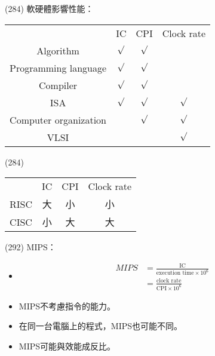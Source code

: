 \item \begin{theorem}{(284)} 軟硬體影響性能：
    \begin{table}[H]
        \centering
        \begin{tabular}{|c|c|c|c|}
            \hline
             & IC & CPI & Clock rate \\
            \Xhline{2\arrayrulewidth}
            Algorithm & $\surd$ & $\surd$ & \\
            \hline
            Programming language & $\surd$ & $\surd$ & \\
            \hline
            Compiler & $\surd$ & $\surd$ & \\
            \hline
            ISA & $\surd$ & $\surd$ & $\surd$ \\
            \hline
            Computer organization & & $\surd$ & $\surd$ \\
            \hline
            VLSI & & & $\surd$ \\
            \hline
        \end{tabular}
    \end{table}
\end{theorem}

\item \begin{theorem}{(284)} \quad\quad
    \begin{table}[H]
        \centering
        \begin{tabular}{|c|c|c|c|}
            \hline
             & IC & CPI & Clock rate \\
            \Xhline{2\arrayrulewidth}
            RISC & 大 & 小 & 小 \\
            \hline
            CISC & 小 & 大 & 大 \\
            \hline
        \end{tabular}
    \end{table}
\end{theorem}

\item \begin{theorem}{(292)} MIPS： \begin{itemize}
        \item \begin{equation}
            \begin{aligned}
                MIPS & = \frac{\text{IC}}{\text{execution time} \times 10^6} \\
                & = \frac{\text{clock rate}}{\text{CPI} \times 10^6}
            \end{aligned}
        \end{equation}
        \item MIPS不考慮指令的能力。
        \item 在同一台電腦上的程式，MIPS也可能不同。
        \item MIPS可能與效能成反比。
    \end{itemize} 
\end{theorem}

